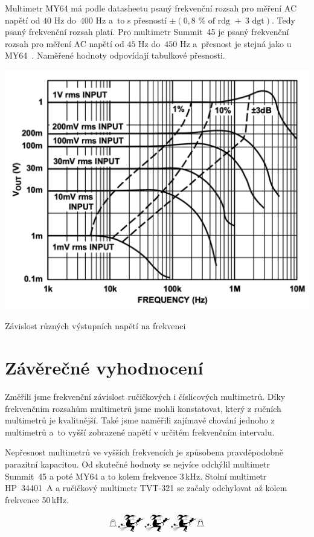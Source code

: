 \documentclass[a4paper,12pt]{article}   %
\begin{document}
Multimetr MY64 má podle datasheetu psaný frekvenční rozsah pro měření AC napětí od $40 \textrm{~Hz}$ do~$400\textrm{~Hz}$ a~to s přesností $\pm(0,8\textrm{~\%~of~rdg~}+~3\textrm{~dgt})$. Tedy psaný frekvenční rozsah platí. Pro multimetr Summit~45 je psaný frekvenční rozsah pro měření AC napětí od $45 \textrm{~Hz}$ do~$450\textrm{~Hz}$ a~přesnost je stejná jako u MY64~\cite{datasheet_multimetry}. Naměřené hodnoty odpovídají tabulkové přesnosti.

\begin{graf}
    \centering
    \includegraphics[width=.6\textwidth]{freq_zavisl.png}
    \caption{Závislost různých výstupních napětí na frekvenci \cite{datasheet_graf}}
    \label{datasheet}
\end{graf}
\section{Závěrečné vyhodnocení}
Změřili jsme frekvenční závislost ručičkových i číslicových multimetrů. Díky frekvenčním rozsahům multimetrů jsme mohli konstatovat, který z ručních multimetrů je kvalitnější. Také jsme naměřili zajímavé chování jednoho z multimetrů a~to vyšší zobrazené napětí v určitém frekvenčním intervalu.

Nepřesnost multimetrů ve vyšších frekvencích je způsobena pravděpodobně parazitní kapacitou. Od skutečné hodnoty se nejvíce odchýlil multimetr Summit~45 a poté MY64 a to kolem frekvence 3\,kHz. Stolní multimetr HP~34401~A a ručičkový multimetr TVT-321 se začaly odchylovat až kolem frekvence 50\,kHz.


\begin{equation*}
    \mathghost \mathwitch* \mathwitch* \mathwitch* \mathghost
\end{equation*}

\clearpage
\renewcommand{\refname}{Seznam použité literatury a~zdrojů informací} 
\end{document}
